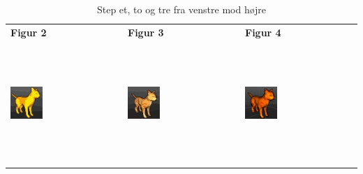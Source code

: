 \begin{table}[h!]
     \begin{center}
     \begin{tabular}{ | l | l | l | }
     \hline
      \textbf{Figur 2} & \textbf{Figur 3} & \textbf{Figur 4}\\ %
     \includegraphics[width=0.3\textwidth,height=45mm]{Files/CelShading/silhouette4.pdf}
     
     &
     \includegraphics[width=0.3\textwidth, height=45mm]{Files/CelShading/silhouette5.pdf}
    
     &
     \includegraphics[width=0.3\textwidth, height=45mm]{Files/CelShading/silhouette6.jpg}
    
   \\ \hline
     
   \end{tabular}
   \caption{Step et, to og tre fra venstre mod højre
   \label{figtbl:modulation}}
   \end{center}
   \end{table}


